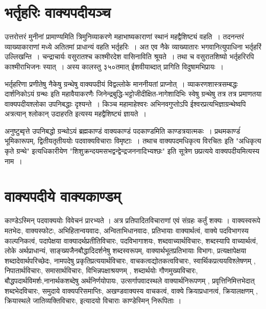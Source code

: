 \vspace{-15pt}
\section*{भर्तृहरिः वाक्यपदीयञ्च} 
\vspace{-15pt}
उत्तरोत्तरं मुनीनां प्रामाण्यमिति त्रिमुनिव्याकरणे महाभाष्यकाराणां स्थानं महद्वैशिष्ट्यं वहति~। तदनन्तरं  व्याख्याकाराणां मध्ये अतितमां प्राधान्यं वहति भर्तृहरिः~। अत एव नैके व्याख्यातारः भगवानित्युपाधिना भर्तृहरिं उल्लिखन्ति~। चन्द्राचार्यः वसुरातश्च काश्मीरदेश वासिनाविति श्रूयते~। तथा च वसुरातशिष्यो भर्तृहरिरपि काश्मीराभिजनः स्यात्~। अस्य कालस्तु ३५०तमात् ईशवीयाब्दात् प्रागिति विदुषामभिप्रायः~। 

भर्तृहरिणा प्रणीतेषु नैकेषु ग्रन्थेषु वाक्यपदीयं विद्वल्लोके माननीयतां प्राप्नोत्~। व्याकरणशास्त्रसम्बद्धः दार्शनिकोऽयं ग्रन्थः इति महावैयाकरणैः जिनेन्द्रबुद्धि-भट्टोजीदीक्षित-नागेशादिभिः स्वेषु ग्रन्थेषु तत्र तत्र प्रमाणतया वाक्यपदीयश्लोका उपनिबद्धाः दृश्यन्ते~। किञ्च महामाहेश्वरः अभिनवगुप्तोऽपि ईश्वरप्रत्यभिज्ञाग्रन्थेष्वपि अत्रत्यान् श्लोकान् उदाहरति इत्यस्य महद्वैशिष्ट्यं ज्ञायते~। 

अनुष्टुब्वृत्ते उपनिबद्धो ग्रन्थोऽयं ब्रह्मकाण्डं वाक्यकाण्डं पदकाण्डमिति काण्डत्रयात्मकः~। प्रथमकाण्डंं भूमिकारूपम्, द्वितीयतृतीययोः पदवाक्यविचाराः विमृष्टाः~। तथाच वाक्यपदमधिकृत्य विरचितः इति "अधिकृत्य कृते ग्रन्थे" इत्यधिकारीयेण "शिशुक्रन्दयमसभद्वन्द्वेन्द्रजननादिभ्यश्छः" इति सूत्रेण छप्रत्यये वाक्यपदीयमित्यस्य नाम~।

\vspace{-15pt}
\section*{वाक्यपदीये वाक्यकाण्डम्}
\vspace{-15pt}
काण्डेऽस्मिन् पदवाक्ययोः विवेचनं प्रारभ्यते ।  अत्र प्रतिपादितविचाराणां एवं संग्रहः कर्तुं शक्यः । वाक्यस्वरूपे मतभेदः, वाक्यस्फोटः, अभिहितान्वयवादः, अन्विताभिधानवादः, प्रतिभायाः वाक्यार्थत्वं, वाक्ये पदविभागस्य काल्पनिकत्वं, पदापेक्षया वाक्यादर्थप्रतीतिविचारः, पदविभागाशयः, शब्दवाच्यार्थविचारः, शब्दस्यापि वाच्यार्थत्वं, लोके अर्थप्राधान्यं, साङ्ख्यजैनबौद्धादिदर्शनेषु शब्दस्वरूपम्, वाक्यार्थभूतप्रतिभायाः विभागः, प्रत्यक्षापेक्षया शब्दादेवार्थपरिच्छेदः, नामपदेषु प्रकृतिप्रत्ययार्थविचारः, वाचकत्वद्योतकत्वविचारः, स्वार्थिकप्रत्ययविश्लेषणम् , निपातार्थविचारः, समासार्थविचारः, विभिन्नपक्षाश्रयणम् , शब्दार्थयोः गौणमुख्यविचारः, बौद्धपदार्थविमर्शः,नानार्थकशब्देषु अर्थनिर्णयोपायः, उत्सर्गापवादस्थले वाक्यार्थनिरूपणम् , प्रवृत्तिनिमित्तभेदात् शब्दभेदविचारः, समुदाये वाक्यपरिसमाप्तिः, अखण्डवाक्यस्य वाचकत्वं, वाक्ये क्रियाप्रधानत्वं, क्रियालक्षणम् , क्रियास्थले जातिव्यक्तिविचारः, इत्यादयो विचाराः काण्डेस्मिन् निरूपिताः ।


